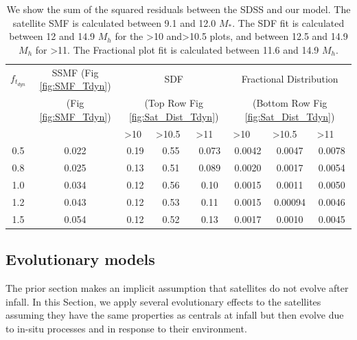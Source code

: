 \begin{table}
\centering
\caption{We show the sum of the squared residuals between the SDSS and our model. The satellite SMF is calculated between 9.1 and 12.0 $M_{*}$. The SDF fit is calculated between 12 and 14.9 $M_h$ for the \textgreater10 and\textgreater10.5 plots, and between 12.5 and 14.9 $M_h$ for \textgreater11. The Fractional plot fit is calculated between 11.6 and 14.9 $M_h$.}
\label{tab:bestfit}
\begin{tabular}{c|c|ccc|ccc}
$f_{t_{dyn}}$   & SSMF   (Fig \ref{fig:SMF_Tdyn})               & \multicolumn{3}{c}{SDF  } \vline & \multicolumn{3}{c}{Fractional Distribution } \\
   &   (Fig \ref{fig:SMF_Tdyn})               & \multicolumn{3}{c}{ (Top Row Fig \ref{fig:Sat_Dist_Tdyn}) } \vline & \multicolumn{3}{c}{ (Bottom Row Fig \ref{fig:Sat_Dist_Tdyn})} \\ \hline
            \multicolumn{1}{l}{} \vline & \multicolumn{1}{l}{} \vline & \multicolumn{1}{l}{\textgreater{}10} & \multicolumn{1}{l}{\textgreater{}10.5} & \multicolumn{1}{l}{\textgreater{}11} \vline & \multicolumn{1}{l}{\textgreater{}10} & \multicolumn{1}{l}{\textgreater{}10.5} & \multicolumn{1}{l}{\textgreater{}11} \\ \hline
0.5    & 0.022   & 0.19  & 0.55    & 0.073    & 0.0042 & 0.0047 & 0.0078  \\
0.8    & 0.025   & 0.13  & 0.51    & 0.089    & 0.0020 & 0.0017 & 0.0054  \\
1.0    & 0.034   & 0.12  & 0.56    & 0.10     & 0.0015 & 0.0011 & 0.0050  \\
1.2    & 0.043   & 0.12  & 0.53    & 0.11     & 0.0015 & 0.00094& 0.0046  \\
1.5    & 0.054   & 0.12  & 0.52    & 0.13     & 0.0017 & 0.0010 & 0.0045                              
\end{tabular}
\end{table}

\subsection{Evolutionary models}

The prior section makes an implicit assumption that satellites do not evolve after infall. In this Section, we apply several evolutionary effects to the satellites assuming they have the same properties as centrals at infall but then evolve due to in-situ processes and in response to their environment.


